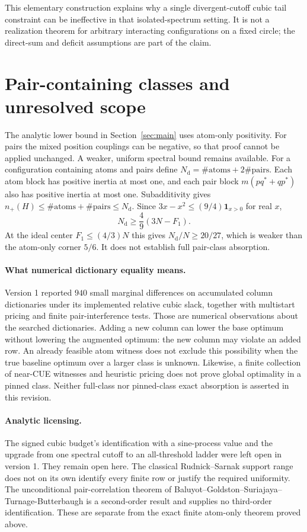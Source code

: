 \documentclass[11pt]{article}
\theoremstyle{definition}\newtheorem{definition}[theorem]{Definition}
\theoremstyle{remark}\newtheorem{remark}[theorem]{Remark}
\newcommand{\Nd}{N_{\mathrm d}}\newcommand{\one}{\mathbf 1}
\begin{document}
This elementary construction explains why a single divergent-cutoff cubic
tail constraint can be ineffective in that isolated-spectrum setting. It is
not a realization theorem for arbitrary interacting configurations on a
fixed circle; the direct-sum and deficit assumptions are part of the claim.

\section{Pair-containing classes and unresolved scope}\label{sec:limits}
The analytic lower bound in Section~\ref{sec:main} uses atom-only positivity.
For pairs the mixed position couplings can be negative, so that proof cannot
be applied unchanged. A weaker, uniform spectral bound remains available.
For a configuration containing atoms and pairs define
$\Nd=\#\mathrm{atoms}+2\#\mathrm{pairs}$.
Each atom block has positive inertia at most one, and each pair block
$m(pq^*+qp^*)$ also has positive inertia at most one.
Subadditivity gives $n_+(H)\le\#\mathrm{atoms}+\#\mathrm{pairs}\le\Nd$.
Since $3x-x^2\le(9/4)\one_{x>0}$ for real $x$,
\[
 \Nd\ge\frac49(3N-F_1).
\]
At the ideal center $F_1\le(4/3)N$ this gives $\Nd/N\ge20/27$,
which is weaker than the atom-only corner $5/6$. It does not establish
full pair-class absorption.

\paragraph{What numerical dictionary equality means.}
Version 1 reported $940$ small marginal differences on accumulated column
dictionaries under its implemented relative cubic slack, together with
multistart pricing and finite pair-interference tests. Those are numerical
observations about the searched dictionaries. Adding a new column can lower
the base optimum without lowering the augmented optimum: the new column
may violate an added row. An already feasible atom witness does not exclude
this possibility when the true baseline optimum over a larger class is
unknown. Likewise, a finite collection of near-CUE witnesses and heuristic
pricing does not prove global optimality in a pinned class. Neither
full-class nor pinned-class exact absorption is asserted in this revision.

\paragraph{Analytic licensing.}
The signed cubic budget's identification with a sine-process value and the
upgrade from one spectral cutoff to an all-threshold ladder were left open
in version 1. They remain open here. The classical Rudnick--Sarnak support
range does not on its own identify every finite row or justify the required
uniformity. The unconditional pair-correlation theorem of
Baluyot--Goldston--Suriajaya--Turnage-Butterbaugh \cite{BGSTB24} is a
second-order result and supplies no third-order identification. These are
separate from the exact finite atom-only theorem proved above.
\end{document}
